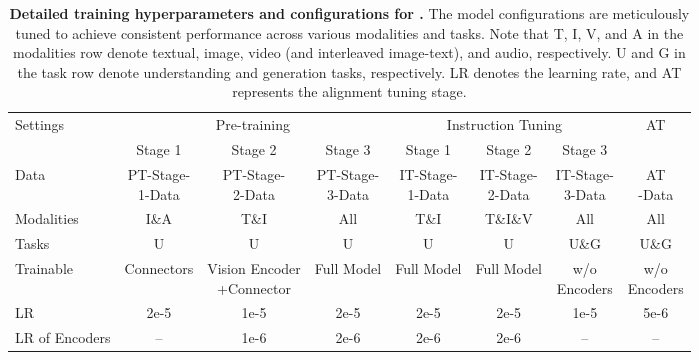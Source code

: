 \begin{table*}[t]
\centering
\caption{\textbf{Detailed training hyperparameters and configurations for \method.}
The model configurations are meticulously tuned to achieve consistent performance across various modalities and tasks.
Note that T, I, V, and A in the modalities row denote textual, image, video (and interleaved image-text), and audio, respectively.
U and G in the task row denote understanding and generation tasks, respectively.
LR denotes the learning rate, and AT represents the alignment tuning stage.
}
{\fontsize{8}{10}\selectfont
\renewcommand{\arraystretch}{1.0}
{
\setlength\tabcolsep{5pt}
\begin{tabular}{l|ccc|ccc|c}
\toprule
\multirow{2}{*}{Settings}         & \multicolumn{3}{c|}{Pre-training}   & \multicolumn{3}{c|}{Instruction Tuning} & AT \\
                                  & Stage 1    & Stage 2    & Stage 3    & Stage 1          & Stage 2           & Stage 3          &           \\
\hline
Data                           & \makecell{PT-Stage-\\1-Data}  & \makecell{PT-Stage-\\2-Data}    & \makecell{PT-Stage-\\3-Data}  & \makecell{IT-Stage-\\1-Data}        & \makecell{IT-Stage-\\2-Data}         & \makecell{IT-Stage-\\3-Data}        & \makecell{AT\\-Data}        \\
Modalities & I\&A        & T\&I      & All              & T\&I        & T\&I\&V         &  All  &  All      \\
Tasks  & U        & U      & U              & U        & U         &  U\&G  &  U\&G      \\
Trainable                         & Connectors        & \makecell{Vision Encoder\\+Connector}      & Full Model & Full Model              & Full Model        & \makecell{w/o\\Encoders}              & \makecell{w/o\\Encoders}       \\
LR                     & 2e-5       & 1e-5         & 2e-5       & 2e-5             & 2e-5              & 1e-5             & 5e-6             \\
LR of Encoders                     & --       & 1e-6         & 2e-6       & 2e-6             & 2e-6              & --             & --             \\

\end{tabular}}}
\end{table*}
